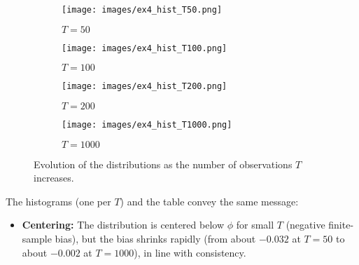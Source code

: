 \documentclass[dvipsnames,11pt]{article}
\begin{document}
\begin{solution}
                \begin{figure}[h]
                     \centering
                     \begin{subfigure}[b]{0.49\textwidth}
                         \centering
                         \texttt{[image: images/ex4\_hist\_T50.png]}
                         \caption{\(T=50\)}
                         \label{fig:ex4_hist_T50}                         
                     \end{subfigure}
                     \hfill
                     \begin{subfigure}[b]{0.49\textwidth}
                         \centering
                         \texttt{[image: images/ex4\_hist\_T100.png]}
                         \caption{\(T=100\)}
                         \label{fig:ex2_path_after_burnin}
                     \end{subfigure}
                     \hfill
                     \begin{subfigure}[b]{0.49\textwidth}
                         \centering
                         \texttt{[image: images/ex4\_hist\_T200.png]}
                         \caption{\(T=200\)}
                         \label{fig:ex2_path_after_burnin}
                     \end{subfigure}
                     \hfill
                     \begin{subfigure}[b]{0.49\textwidth}
                         \centering
                         \texttt{[image: images/ex4\_hist\_T1000.png]}
                         \caption{\(T=1000\)}
                         \label{fig:ex2_path_after_burnin}
                     \end{subfigure}
                    \label{fig:ex_1c}
                    \caption{Evolution of the distributions as the number of observations \(T\) increases.}
                \end{figure}

        The histograms (one per $T$) and the table convey the same message:
        
        \begin{itemize}
            \item \textbf{Centering:} The distribution is centered below $\phi$ for small $T$ (negative finite-sample bias), but the bias shrinks rapidly (from about $-0.032$ at $T=50$ to about $-0.002$ at $T=1000$), in line with consistency.
          

\end{itemize}
\end{solution}
\end{document}
